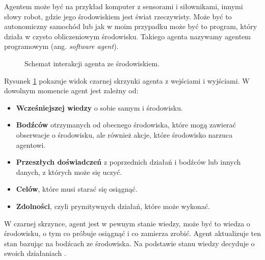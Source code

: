 \documentclass[a4paper, 12pt,twoside]{report}
\begin{document}
Agentem może być na przykład komputer z sensorami i siłownikami, innymi słowy
robot, gdzie jego środowiskiem jest świat rzeczywisty. Może być to autonomiczny
samochód lub jak w moim przypadku może być to program, który
działa w czysto obliczeniowym środowisku. Takiego agenta nazywamy agentem
programowym (ang. \textit{software agent}).
\begin{figure}[!htb] 
\begin{center}
\end{center}
\caption{Schemat interakcji agenta ze środowiskiem.}
\label{rl_figure}
\end{figure}

Rysunek \ref{rl_figure} pokazuje widok czarnej skrzynki agenta z wejściami
i wyjściami. W dowolnym momencie agent jest zależny od:
\begin{itemize}
	\setlength\itemsep{-0.4em}
	\item \textbf{Wcześniejszej wiedzy} o sobie samym i środowisku.
	\item \textbf{Bodźców} otrzymanych od obecnego
		środowiska, które mogą zawierać obserwacje o
		środowisku, ale również akcje, które środowisko
		narzuca agentowi.
	\item \textbf{Przeszłych doświadczeń} z poprzednich
		działań i bodźców lub innych danych, z których
		może się uczyć.
	\item \textbf{Celów}, które musi starać się osiągnąć.
	\item \textbf{Zdolności}, czyli prymitywnych działań, które
		może wykonać.
\end{itemize}
W czarnej skrzynce, agent jest w pewnym stanie wiedzy, może być to wiedza o
środowisku, o tym co próbuje osiągnąć i co zamierza zrobić. Agent aktualizuje
ten stan bazując na bodźcach ze środowiska. Na podstawie stanu wiedzy decyduje
o swoich działaniach \cite{ai_foundations_agents_situated}.
\end{document}
